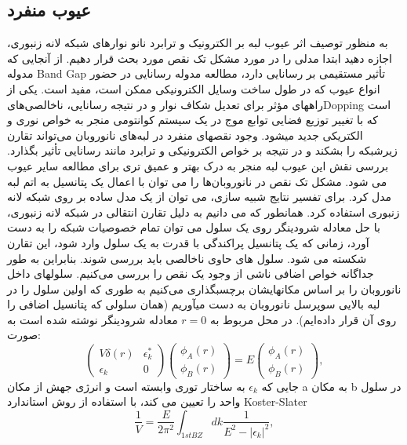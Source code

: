 \subsection{عیوب منفرد} 
به منظور توصیف اثر عیوب لبه بر الکترونیک و ترابرد نانو نوارهای شبکه لانه زنبوری، اجازه دهید ابتدا مدلی را در مورد مشکل تک نقص مورد بحث قرار دهیم. از آنجایی که مدوله \gls{Band Gap} تأثیر مستقیمی بر رسانایی دارد، مطالعه مدوله رسانایی در حضور انواع عیوب که در طول ساخت وسایل الکترونیکی ممکن است، مفید است. یکی از راههای مؤثر برای تعدیل شکاف نوار و در نتیجه رسانایی، ناخالصی‌های\gls{Dopping} است که با تغییر توزیع فضایی توابع موج در یک سیستم کوانتومی منجر به خواص نوری و الکتریکی جدید میشود. وجود نقصهای منفرد در لبه‌های نانوروبان می‌تواند تقارن زیرشبکه را بشکند و در نتیجه بر خواص الکترونیکی و ترابرد مانند رسانایی تأثیر بگذارد. بررسی نقش این عیوب لبه منجر به درک بهتر و عمیق تری برای مطالعه سایر عیوب می شود. مشکل تک نقص در نانوروبان‌ها را می توان با اعمال یک پتانسیل به اتم لبه مدل کرد. برای تفسیر نتایج شبیه سازی، می توان از یک مدل ساده بر روی شبکه لانه زنبوری استفاده کرد. همانطور که می دانیم به دلیل تقارن انتقالی در شبکه لانه زنبوری، با حل معادله شرودینگر روی یک سلول می توان تمام خصوصیات شبکه را به دست آورد، زمانی که یک پتانسیل پراکندگی با قدرت  به یک سلول وارد شود، این تقارن شکسته می شود. سلول های حاوی ناخالصی باید بررسی شوند. بنابراین به طور جداگانه خواص اضافی ناشی از وجود یک نقص را بررسی می‌کنیم. سلولهای داخل نانوروبان را بر اساس مکانهایشان برچسبگذاری می‌کنیم به طوری که اولین سلول را در لبه بالایی سوپرسل نانوروبان به دست میآوریم (همان سلولی که پتانسیل اضافی را روی آن قرار داده‌ایم). در محل مربوط به $r = 0$ معادله شرودینگر نوشته شده است به صورت:
\begin{equation}
  \left(
  \begin{array}{cc}
    V\delta(r)&\epsilon^{*}_{k}\\
    \epsilon_k & 0
  \end{array}
  \right)
  \left(
  \begin{array}{c}
    \phi_{A}(r)\\
    \phi_{B}(r)
  \end{array}
  \right)
  =E
  \left(
  \begin{array}{c}
    \phi_{A}(r)\\
    \phi_{B}(r)
  \end{array}
  \right),
\end{equation}
جایی که $\epsilon_k$ به ساختار توری وابسته است و انرژی جهش از مکان a به مکان b در سلول واحد را تعیین می کند، با استفاده از روش استاندارد Koster-Slater%
\begin{equation}
  \frac{1}{V}=\frac{E}{2\pi^2}\int_{1st BZ}dk\frac{1}{E^2-|\epsilon_k|^2},
  \label{virtual}
\end{equation}

